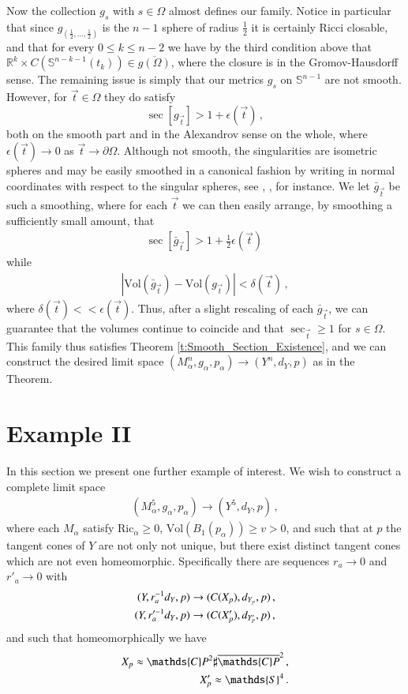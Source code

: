 \documentclass[11pt]{article}
\newcommand{\Ric}{\text{Ric}}
\newcommand{\Vol}{\text{Vol}}
\newcommand{\RR}{\mathds{R}}
\newcommand{\Sn}{\mathds{S}}
\begin{document}
Now the collection $g_s$ with $s\in \Omega$ almost defines our family.  Notice in particular that since $g_{(\frac{1}{2},\ldots,\frac{1}{2})}$ is the $n-1$ sphere of radius $\frac{1}{2}$ it is certainly Ricci closable, and that for every $0\leq k\leq n-2$ we have by the third condition above that $\RR^k\times C(\Sn^{n-k-1}(t_k))\in \overline{g(\Omega)}$, where the closure is in the Gromov-Hausdorff sense.  The remaining issue is simply that our metrics $g_s$ on $\Sn^{n-1}$ are not smooth.  However, for $\vec t\in\Omega$ they do satisfy 
$$\sec[g_{\vec t}]> 1+\epsilon(\vec t)\, ,$$
both on the smooth part and in the Alexandrov sense on the whole, where $\epsilon(\vec t)\to 0$ as $\vec t\to\partial\Omega$.  Although not smooth, the singularities are isometric spheres and may be easily smoothed in a canonical fashion by writing in normal coordinates with respect to the singular spheres, see \cite{P1}, \cite{M1}, \cite{M3} for instance.  We let $\bar g_{\vec t}$ be such a smoothing, where for each $\vec t$ we can then easily arrange, by smoothing a sufficiently small amount, that 
\begin{align}
\sec[\bar g_{\vec t}]>1+\frac{1}{2}\epsilon(\vec t)\,
\end{align}
while 
\begin{align}
 |\Vol(\bar g_{\vec t})-\Vol(g_{\vec t})|<\delta(\vec t)\, ,
\end{align}
where $\delta(\vec t)<<\epsilon(\vec t)$.  Thus, after a slight rescaling of each $\bar g_{\vec t}$, we can guarantee that the volumes continue to coincide and that $\sec_{\vec t}\geq 1$ for $s\in\Omega$.  This family thus satisfies Theorem \ref{t:Smooth_Section_Existence}, and we can construct the desired limit space $(M^n_\alpha,g_\alpha,p_\alpha)\rightarrow (Y^n,d_Y,p)$ as in the Theorem.  


\section{Example II}\label{ss:Example3}

In this section we present one further example of interest.  We wish to construct a complete limit space
\begin{align}
(M^{5}_{\alpha},g_\alpha,p_\alpha)\rightarrow (Y^5,d_Y,p)\, ,
\end{align}
where each $M_\alpha$ satisfy $\Ric_\alpha\geq 0$, $\Vol(B_1(p_\alpha))\geq v>0$, and such that at $p$ the tangent cones of $Y$ are not only not unique, but there exist distinct tangent cones which are not even homeomorphic.  Specifically there are sequences $r_a\rightarrow 0$ and $r'_a\rightarrow 0$ with
\begin{align}
(Y,r_a^{-1}d_Y,p)\rightarrow (C(X_p),d_{Y_p},p)\, ,\notag\\
(Y,r_a'^{-1}d_Y,p)\rightarrow (C(X_p'),d_{Y_p'},p)\, ,
\end{align}
and such that homeomorphically we have
\begin{align}
X_p\approx \mathds{C}P^2\sharp \overline{\mathds{C}P}^2\, ,\notag\\
X_p'\approx \Sn^4\, .
\end{align}
\end{document}
